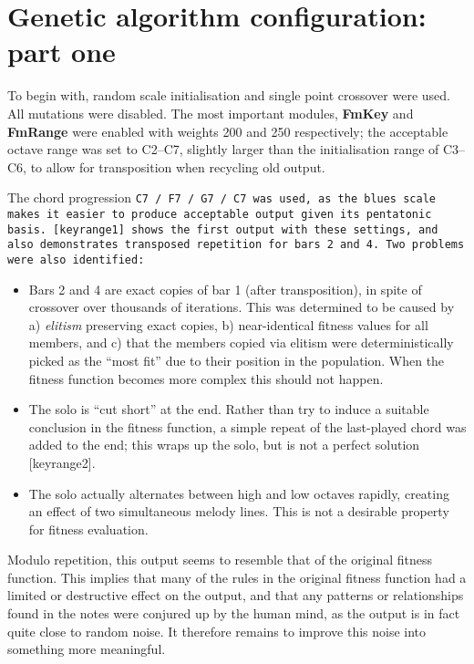\section{Genetic algorithm configuration: part one}

To begin with, random scale initialisation and single point crossover were used. All mutations were disabled.
The most important modules, \textbf{FmKey} and \textbf{FmRange} were enabled with weights 200 and 250 respectively;
the acceptable octave range was set to C2--C7, slightly larger than the initialisation range of C3--C6, to allow for
transposition when recycling old output.

The chord progression \tt{C7 / F7 / G7 / C7} was used, as the blues scale makes it easier to produce acceptable
output given its pentatonic basis. [keyrange1] shows the first output with these settings, and also demonstrates
transposed repetition for bars 2 and 4. Two problems were also identified:
\begin{itemize}
\item Bars 2 and 4 are exact copies of bar 1 (after transposition), in spite of crossover over thousands of iterations. This was determined to be caused by a) \emph{elitism} preserving exact copies, b) near-identical fitness values for all members, and c) that the members copied via elitism were deterministically picked as the ``most fit'' due to their position in the population. When the fitness function becomes more complex this should not happen.
\item The solo is ``cut short'' at the end. Rather than try to induce a suitable conclusion in the fitness function, a simple repeat of the last-played chord was added to the end; this wraps up the solo, but is not a perfect solution [keyrange2].
\item The solo actually alternates between high and low octaves rapidly, creating an effect of two simultaneous melody lines. This is not a desirable property for fitness evaluation.
\end{itemize}

Modulo repetition, this output seems to resemble that of the original fitness function. This implies that many of the rules
in the original fitness function had a limited or destructive effect on the output, and that any patterns or relationships found in the notes were conjured up by the human mind, as the output is in fact quite close to random noise. It therefore remains to improve this noise into something more meaningful.

